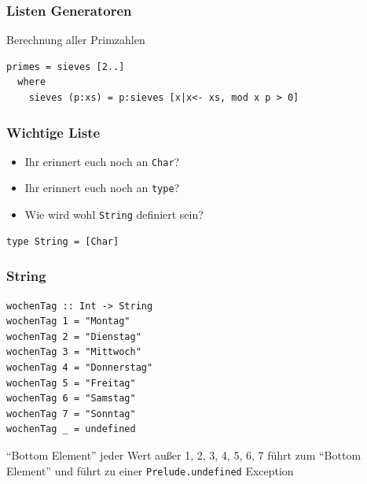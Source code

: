 \begin{frame}[fragile]
\frametitle{Listen Generatoren}
\begin{block}{Berechnung aller Primzahlen}
\begin{lstlisting}
primes = sieves [2..]
  where
    sieves (p:xs) = p:sieves [x|x<- xs, mod x p > 0]
\end{lstlisting}
\end{block}
\end{frame}

\begin{frame}[fragile]
\frametitle{Wichtige Liste} 
\begin{block}{\vspace*{-3ex}}
\begin{itemize}
  \item Ihr erinnert euch noch an \lstinline|Char|?
  \item Ihr erinnert euch noch an \lstinline|type|?
  \item Wie wird wohl \lstinline|String| definiert sein?
\end{itemize}
\end{block}
\pause
\begin{lstlisting}
type String = [Char]
\end{lstlisting}
\end{frame}


\begin{frame}[fragile]
\frametitle{String} 
\begin{lstlisting}
wochenTag :: Int -> String
wochenTag 1 = "Montag"
wochenTag 2 = "Dienstag"
wochenTag 3 = "Mittwoch"
wochenTag 4 = "Donnerstag"
wochenTag 5 = "Freitag"
wochenTag 6 = "Samstag"
wochenTag 7 = "Sonntag"
wochenTag _ = undefined
\end{lstlisting}
\begin{alertblock}{"`Bottom Element"'}
jeder Wert außer 1, 2, 3, 4, 5, 6, 7 führt zum "`Bottom Element"' und führt zu einer \lstinline|Prelude.undefined| Exception
\end{alertblock}
\end{frame}

